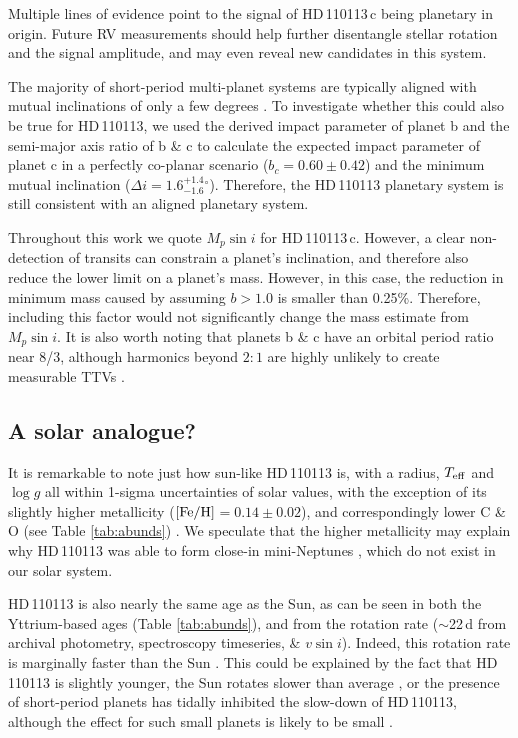 \documentclass[fleqn,usenatbib]{mnras}
\newcommand{\vsini}{$v\sin{i}$}
\newcommand{\teff}{$T_{\rm eff}$}
\newcommand{\feh}{\mbox{$\rm [Fe/H]$}}
\newcommand{\logg}{$\log g$}
\newcommand{\Tstar}{HD\,110113}
\newcommand{\Tplanetc}{HD\,110113\,c}
\begin{document}
Multiple lines of evidence point to the signal of \Tplanetc{} being planetary in origin.
Future RV measurements should help further disentangle stellar rotation and the signal amplitude, and may even reveal new candidates in this system.

The majority of short-period multi-planet systems are typically aligned with mutual inclinations of only a few degrees \citep{lissauer2011architecture, 2012A&A...541A.139F,winn2015occurrence}.
To investigate whether this could also be true for \Tstar{}, we used the derived impact parameter of planet b and the semi-major axis ratio of b \& c to calculate the expected impact parameter of planet c in a perfectly co-planar scenario ($b_c = 0.60\pm0.42$) and the minimum mutual inclination ($\Delta{}i = 1.6^{+1.4}_{-1.6}^{\circ}$).
Therefore, the \Tstar{} planetary system is still consistent with an aligned planetary system.

Throughout this work we quote $M_p\sin{i}$ for \Tplanetc{}. However, a clear non-detection of transits can constrain a planet's inclination, and therefore also reduce the lower limit on a planet's mass.
However, in this case, the reduction in minimum mass caused by assuming $b>1.0$ is smaller than 0.25\%. Therefore, including this factor would not significantly change the mass estimate from $M_p\sin{i}$.
It is also worth noting that planets b \& c have an orbital period ratio near 8/3, although harmonics beyond $2:1$ are highly unlikely to create measurable TTVs \citep{deck2015measurement}.

\subsection{A solar analogue?}
It is remarkable to note just how sun-like \Tstar{} is, with a radius, \teff{} and \logg{} all within 1-sigma uncertainties of solar values, with the exception of its slightly higher metallicity (\feh{}$ = 0.14\pm0.02$), and correspondingly lower C \& O (see Table \ref{tab:abunds}) \citep[e.g.][]{Franchini2020,2015A&A...576A..89B}.
We speculate that the higher metallicity may explain why \Tstar{} was able to form close-in mini-Neptunes \citep{mulders2016super,bitsch2020influence}, which do not exist in our solar system.

\Tstar{} is also nearly the same age as the Sun, as can be seen in both the Yttrium-based ages (Table \ref{tab:abunds}), and from the rotation rate ($\sim$22\,d from archival photometry, spectroscopy timeseries, \& \vsini{}).
Indeed, this rotation rate is marginally faster than the Sun \citep[25--26.5\,d when measured with HARPS-N and converted to sidereal period,][]{milbourne2019harps}.
This could be explained by the fact that \Tstar{} is slightly younger, the Sun rotates slower than average \citep{2008ApJ...684..691R}, or the presence of short-period planets has tidally inhibited the slow-down of \Tstar{}, although the effect for such small planets is likely to be small \citep{bolmont2012effect}.
\end{document}
